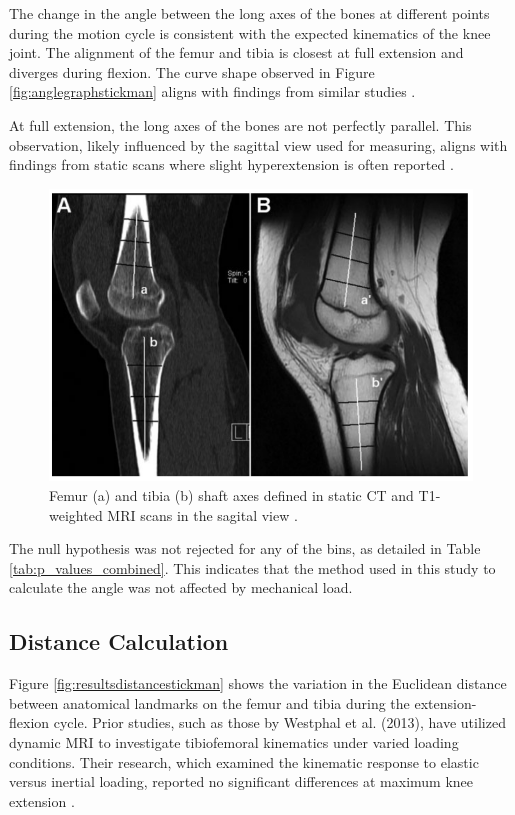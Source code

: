 \documentclass{micro-econ-thesis}
\begin{document}
The change in the angle between the long axes of the bones at different points during the motion cycle is consistent with the expected kinematics of the knee joint. The alignment of the femur and tibia is closest at full extension and diverges during flexion. The curve shape observed in Figure \ref{fig:anglegraphstickman} aligns with findings from similar studies \parencite{jeon_detection_2019}.

At full extension, the long axes of the bones are not perfectly parallel. This observation, likely influenced by the sagittal view used for measuring, aligns with findings from static scans where slight hyperextension is often reported \parencite{dai_comparing_2021}. 

\begin{figure}[H]
	\centering
	\includegraphics[width=0.7\linewidth]{dai_image}
	\caption{Femur (a) and tibia (b) shaft axes defined in static CT and T1-weighted MRI scans in the sagital view \parencite{dai_comparing_2021}. }
	\label{fig:daiimage}
\end{figure}

The null hypothesis was not rejected for any of the bins, as detailed in Table \ref{tab:p_values_combined}. This indicates that the method used in this study to calculate the angle was not affected by mechanical load.



\subsection{Distance Calculation}

Figure \ref{fig:resultsdistancestickman} shows the variation in the Euclidean distance between anatomical landmarks on the femur and tibia during the extension-flexion cycle. Prior studies, such as those by Westphal et al. (2013), have utilized dynamic MRI to investigate tibiofemoral kinematics under varied loading conditions. Their research, which examined the kinematic response to elastic versus inertial loading, reported no significant differences at maximum knee extension \parencite{westphal_load-dependent_2013}.
\end{document}
